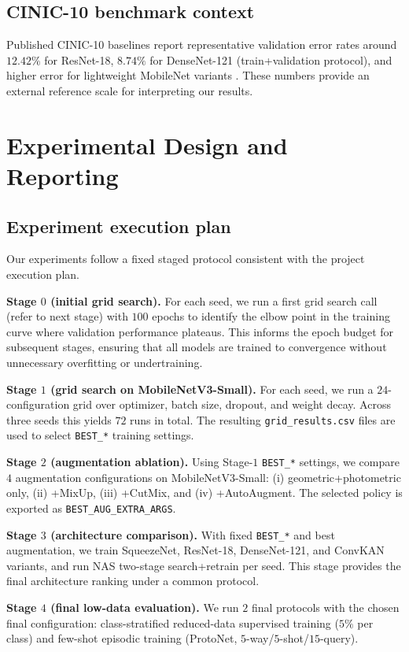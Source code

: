 \documentclass[cameraready]{Interspeech}
\begin{document}
\subsection{CINIC-10 benchmark context}
Published CINIC-10 baselines report representative validation error rates around $12.42\%$ for ResNet-18, $8.74\%$ for DenseNet-121 (train+validation protocol), and higher error for lightweight MobileNet variants \cite{cinic}. These numbers provide an external reference scale for interpreting our results.

\section{Experimental Design and Reporting}
\subsection{Experiment execution plan}
\label{sec:execution_plan}
Our experiments follow a fixed staged protocol consistent with the project execution plan.

\textbf{Stage $0$ (initial grid search).} For each seed, we run a first grid search call (refer to next stage) with $100$ epochs to identify the elbow point in the training curve where validation performance plateaus. This informs the epoch budget for subsequent stages, ensuring that all models are trained to convergence without unnecessary overfitting or undertraining.

\textbf{Stage $1$ (grid search on MobileNetV3-Small).} For each seed, we run a $24$-configuration grid over optimizer, batch size, dropout, and weight decay. Across three seeds this yields $72$ runs in total. The resulting \texttt{grid\_results.csv} files are used to select \texttt{BEST\_*} training settings.

\textbf{Stage $2$ (augmentation ablation).} Using Stage-$1$ \texttt{BEST\_*} settings, we compare $4$ augmentation configurations on MobileNetV3-Small: (i) geometric+photometric only, (ii) +MixUp, (iii) +CutMix, and (iv) +AutoAugment. The selected policy is exported as \texttt{BEST\_AUG\_EXTRA\_ARGS}.

\textbf{Stage $3$ (architecture comparison).} With fixed \texttt{BEST\_*} and best augmentation, we train SqueezeNet, ResNet-18, DenseNet-121, and ConvKAN variants, and run NAS two-stage search+retrain per seed. This stage provides the final architecture ranking under a common protocol.

\textbf{Stage $4$ (final low-data evaluation).} We run $2$ final protocols with the chosen final configuration: class-stratified reduced-data supervised training ($5\%$ per class) and few-shot episodic training (ProtoNet, $5$-way/$5$-shot/$15$-query).
\end{document}
